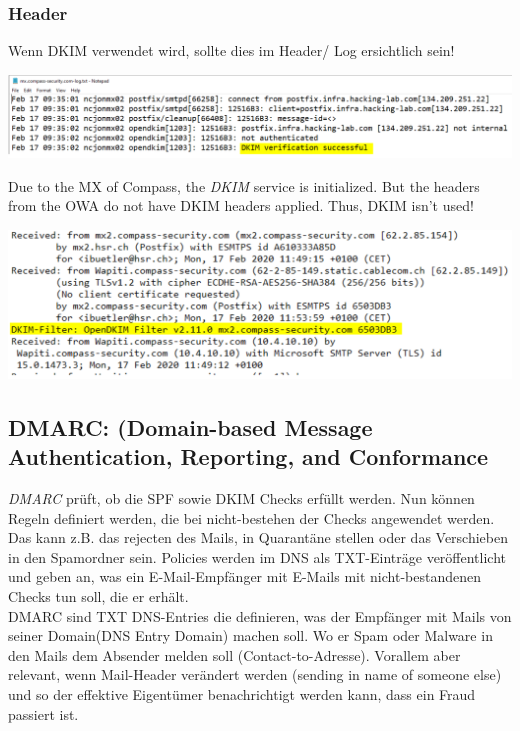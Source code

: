 \subsubsection{Header}
Wenn DKIM verwendet wird, sollte dies im Header/ Log ersichtlich sein!
\begin{center}
    \vspace{-8pt}
    \includegraphics[width=1.0\linewidth]{./img/07-mail_security/dkim}
    \vspace{-8pt}
\end{center}
Due to the MX of Compass, the \textit{DKIM} service is initialized. But the headers from the OWA do not have DKIM headers applied. Thus, DKIM isn't used!
\begin{center}
    \vspace{-8pt}
    \includegraphics[width=.8\linewidth]{./img/07-mail_security/dkim2}
    \vspace{-8pt}
\end{center}

\columnbreak

\subsection{DMARC: (Domain-based Message Authentication, Reporting, and Conformance}
\textit{DMARC} prüft, ob die SPF sowie DKIM Checks erfüllt werden. Nun können Regeln definiert werden, die bei nicht-bestehen der Checks angewendet werden. Das kann z.B. das rejecten des Mails, in Quarantäne stellen oder das Verschieben in den Spamordner sein.
Policies werden im DNS als TXT-Einträge veröffentlicht und geben an, was ein E-Mail-Empfänger mit E-Mails mit nicht-bestandenen Checks tun soll, die er erhält.\\

DMARC sind TXT DNS-Entries die definieren, was der Empfänger mit Mails von seiner Domain(DNS Entry Domain) machen soll. 
Wo er Spam oder Malware in den Mails dem Absender melden soll (Contact-to-Adresse). 
Vorallem aber relevant, wenn Mail-Header verändert werden (sending in name of someone else) und so der effektive Eigentümer benachrichtigt werden kann, dass ein Fraud passiert ist.

